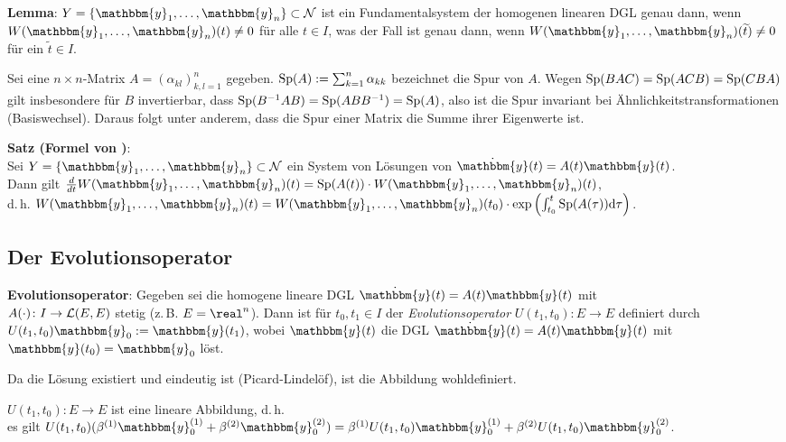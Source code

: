 \linie

\textbf{Lemma}:
$Y = \{\mathbbm{y}_1, \dotsc, \mathbbm{y}_n\} \subset \mathcal{N}$
ist ein Fundamentalsystem der homogenen linearen DGL  genau
dann, wenn $W(\mathbbm{y}_1, \dotsc, \mathbbm{y}_n)(t) \not= 0$ für alle
$t \in I$, was der Fall ist genau dann, wenn
$W(\mathbbm{y}_1, \dotsc, \mathbbm{y}_n)(\widetilde{t}) \not= 0$ für ein
$\widetilde{t} \in I$.

Sei eine $n \times n$-Matrix $A = (\alpha_{kl})_{k,l=1}^n$ gegeben.
$\operatorname{Sp}(A) := \sum_{k=1}^n \alpha_{kk}$ bezeichnet die Spur von $A$.
Wegen $\operatorname{Sp}(BAC) = \operatorname{Sp}(ACB) = \operatorname{Sp}(CBA)$ gilt insbesondere für $B$ invertierbar,
dass $\operatorname{Sp}(B^{-1} A B) = \operatorname{Sp}(A B B^{-1}) = \operatorname{Sp}(A)$, also ist die Spur invariant
bei Ähnlichkeitstransformationen (Basiswechsel).
Daraus folgt unter anderem, dass die Spur einer Matrix die Summe ihrer
Eigenwerte ist.

\textbf{Satz (Formel von )}: \\
Sei $Y = \{\mathbbm{y}_1, \dotsc, \mathbbm{y}_n\} \subset \mathcal{N}$
ein System von Lösungen von $\dot{\mathbbm{y}}(t) = A(t) \mathbbm{y}(t)$. \\
Dann gilt $\frac{d}{dt} W(\mathbbm{y}_1, \dotsc, \mathbbm{y}_n)(t) =
\Sp(A(t)) \cdot W(\mathbbm{y}_1, \dotsc, \mathbbm{y}_n)(t)$, \\
d.\,h. $W(\mathbbm{y}_1, \dotsc, \mathbbm{y}_n)(t) =
W(\mathbbm{y}_1, \dotsc, \mathbbm{y}_n)(t_0) \cdot
\exp\left(\int_{t_0}^t \Sp(A(\tau))\d\tau\right)$.

\pagebreak

\subsection{%
    Der Evolutionsoperator%
}

\textbf{Evolutionsoperator}:
Gegeben sei die homogene lineare DGL
$\dot{\mathbbm{y}}(t) = A(t) \mathbbm{y}(t)$ mit \\
$A(\cdot)\colon I \rightarrow \mathcal{L}(E, E)$ stetig (z.\,B. $E = \real^n$).
Dann ist für $t_0, t_1 \in I$ der \emph{Evolutionsoperator}
$U(t_1, t_0)\colon E \rightarrow E$ definiert durch
$U(t_1, t_0) \mathbbm{y}_0 := \mathbbm{y}(t_1)$, wobei $\mathbbm{y}(t)$ die DGL
$\dot{\mathbbm{y}}(t) = A(t) \mathbbm{y}(t)$ mit
$\mathbbm{y}(t_0) = \mathbbm{y}_0$ löst.

Da die Lösung existiert und eindeutig ist (Picard-Lindelöf),
ist die Abbildung wohldefiniert.

$U(t_1, t_0)\colon E \rightarrow E$ ist eine lineare Abbildung, d.\,h. \\
es gilt $U(t_1, t_0)(\beta^{(1)} \mathbbm{y}_0^{(1)} +
\beta^{(2)} \mathbbm{y}_0^{(2)}) =
\beta^{(1)} U(t_1, t_0) \mathbbm{y}_0^{(1)} +
\beta^{(2)} U(t_1, t_0) \mathbbm{y}_0^{(2)}$.

